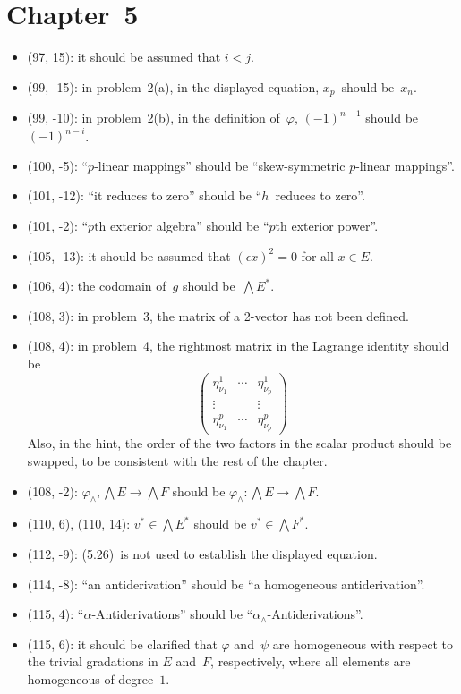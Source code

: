 \documentclass[letterpaper,12pt]{article}
\newcommand{\eprod}{\wedge}
\newcommand{\bigeprod}{\bigwedge}
\begin{document}
\section*{Chapter~5}
\begin{itemize}
\item (97, 15): it should be assumed that \(i<j\).
\item (99, -15): in problem~2(a), in the displayed equation, \(x_p\)~should be~\(x_n\).
\item (99, -10): in problem~2(b), in the definition of~\(\varphi\), \((-1)^{n-1}\) should be \((-1)^{n-i}\).
\item (100, -5): ``\(p\)-linear mappings'' should be ``skew-symmetric \(p\)-linear mappings''.
\item (101, -12): ``it reduces to zero'' should be ``\(h\)~reduces to zero''.
\item (101, -2): ``\(p\)th exterior algebra'' should be ``\(p\)th exterior power''.
\item (105, -13): it should be assumed that \((\epsilon x)^2=0\) for all \(x\in E\).
\item (106, 4): the codomain of~\(g\) should be~\(\bigwedge E^*\).
\item (108, 3): in problem~3, the matrix of a 2-vector has not been defined.
\item (108, 4): in problem~4, the rightmost matrix in the Lagrange identity should be
\[
\begin{pmatrix}
\eta^1_{\nu_1}&\cdots&\eta^1_{\nu_p}\\
\vdots&&\vdots\\
\eta^p_{\nu_1}&\cdots&\eta^p_{\nu_p}
\end{pmatrix}
\]
Also, in the hint, the order of the two factors in the scalar product should be swapped, to be consistent with the rest of the chapter.
\item (108, -2): \(\varphi_{\eprod},\bigeprod E\to\bigeprod F\) should be \(\varphi_{\eprod}:\bigeprod E\to\bigeprod F\).
\item (110, 6), (110, 14): \(v^*\in\bigeprod E^*\) should be \(v^*\in\bigeprod F^*\).
\item (112, -9): (5.26)~is not used to establish the displayed equation.
\item (114, -8): ``an antiderivation'' should be ``a homogeneous antiderivation''.
\item (115, 4): ``\(\alpha\)-Antiderivations'' should be ``\(\alpha_{\eprod}\)-Antiderivations''.
\item (115, 6): it should be clarified that \(\varphi\) and~\(\psi\) are homogeneous with respect to the trivial gradations in \(E\) and~\(F\), respectively, where all elements are homogeneous of degree~\(1\).

\end{itemize}
\end{document}
